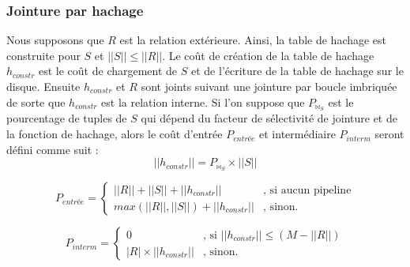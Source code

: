 \subsubsection{Jointure par hachage}
Nous supposons que $R$ est la relation extérieure. Ainsi, la table de hachage est construite pour $S$ et $|| S || \leqslant || R ||$. Le coût de création de la table de hachage $h_{constr}$ est le coût de chargement de $S$ et de l'écriture de la table de hachage sur le disque. Ensuite $h_{constr}$ et $R$ sont joints suivant une jointure par boucle imbriquée de sorte que $h_{constr}$ est la relation interne. Si l'on suppose que $P_{\bowtie_S}$ est le pourcentage de tuples de $S$ qui dépend du facteur de sélectivité de jointure et de la fonction de hachage, alors le coût d'entrée $P_{entrée}$ et intermédiaire $P_{interm}$  seront défini comme suit :
\begin{equation}
|| h_{constr} || = P_{\bowtie_S} \times || S ||
\end{equation} 

\begin{equation}
 P_{entrée} = \begin{cases}
			|| R || + || S || + || h_{constr} || & \text{, si aucun pipeline} \\
			max (|| R ||, || S ||) + || h_{constr} ||  & \text{, sinon.}
\end{cases}
\end{equation}

\begin{equation}
 P_{interm} = \begin{cases}
			0 & \text{, si } || h_{constr} || \leqslant (M- || R ||) \\
			| R | \times || h_{constr} ||  & \text{, sinon.}
\end{cases}
\end{equation}

